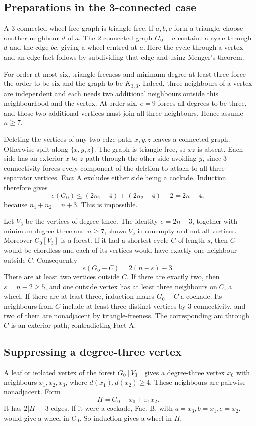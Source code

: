\subsection*{Preparations in the 3-connected case}
A 3-connected wheel-free graph is triangle-free.
If \(a,b,c\) form a triangle, choose another neighbour \(d\) of \(a\).
The 2-connected graph \(G_0-a\) contains a cycle through \(d\) and the edge \(bc\), giving a wheel centred at \(a\).
Here the cycle-through-a-vertex-and-an-edge fact follows by subdividing that edge and using Menger's theorem.

For order at most six, triangle-freeness and minimum degree at least three force the order to be six and the graph to be \(K_{3,3}\).
Indeed, three neighbours of a vertex are independent and each needs two additional neighbours outside this neighbourhood and the vertex.
At order six, \(e=9\) forces all degrees to be three, and those two additional vertices must join all three neighbours.
Hence assume \(n\geq7\).

Deleting the vertices of any two-edge path \(x,y,z\) leaves a connected graph.
Otherwise split along \(\{x,y,z\}\). The graph is triangle-free, so \(xz\) is absent.
Each side has an exterior \(x\)-to-\(z\) path through the other side avoiding \(y\), since 3-connectivity forces every component of the deletion to attach to all three separator vertices.
Fact A excludes either side being a cockade.
Induction therefore gives
\[
 e(G_0)\leq (2n_1-4)+(2n_2-4)-2=2n-4,
\]
because \(n_1+n_2=n+3\). This is impossible.

Let \(V_3\) be the vertices of degree three.
The identity \(e=2n-3\), together with minimum degree three and \(n\geq7\), shows \(V_3\) is nonempty and not all vertices.
Moreover \(G_0[V_3]\) is a forest.
If it had a shortest cycle \(C\) of length \(s\), then \(C\) would be chordless and each of its vertices would have exactly one neighbour outside \(C\).
Consequently
\[
 e(G_0-C)=2(n-s)-3.
\]
There are at least two vertices outside \(C\).
If there are exactly two, then \(s=n-2\geq5\), and one outside vertex has at least three neighbours on \(C\), a wheel.
If there are at least three, induction makes \(G_0-C\) a cockade.
Its neighbours from \(C\) include at least three distinct vertices by 3-connectivity, and two of them are nonadjacent by triangle-freeness.
The corresponding arc through \(C\) is an exterior path, contradicting Fact A.

\subsection*{Suppressing a degree-three vertex}
A leaf or isolated vertex of the forest \(G_0[V_3]\) gives a degree-three vertex \(x_0\) with neighbours \(x_1,x_2,x_3\), where \(d(x_1),d(x_2)\geq4\).
These neighbours are pairwise nonadjacent.
Form
\[
 H=G_0-x_0+x_1x_2.
\]
It has \(2|H|-3\) edges.
If it were a cockade, Fact B, with \(a=x_3,b=x_1,c=x_2\), would give a wheel in \(G_0\).
So induction gives a wheel in \(H\).

